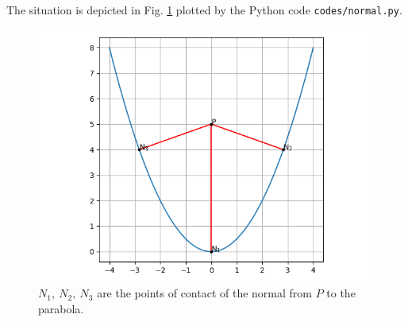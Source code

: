 \documentclass[journal,12pt,twocolumn]{IEEEtran}
\begin{document}
\begin{enumerate}
    The situation is depicted in Fig. \ref{fig:normal} plotted by the Python
    code \texttt{codes/normal.py}.
    \begin{figure}[!ht]
        \centering
        \includegraphics[width=\columnwidth]{figs/normal.png}
        \caption{$N_1,\ N_2,\ N_3$ are the points of contact of the normal from 
        $P$ to the parabola.}
        \label{fig:normal}
    \end{figure}
\end{enumerate}
\end{document}
